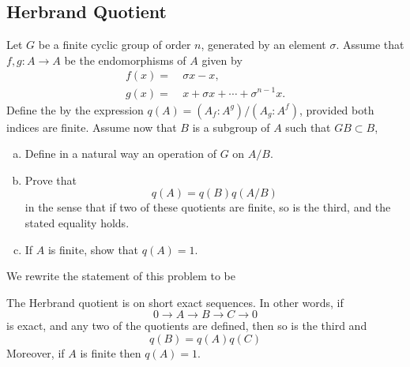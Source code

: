 \subsection{Herbrand Quotient}
\cite{serre1980local}
\begin{ex}
  Let $G$ be a finite cyclic group of order $n$, generated by an element $\sigma$. Assume that $f,g\colon A\to A$ be the endomorphisms of $A$ given by
  \begin{align*}
    f(x)=&\ \sigma x-x,\\
    g(x)=&\ x+\sigma x+\cdots +\sigma^{n-1}x.
  \end{align*}
  Define the  by the expression $q(A) = (A_f:A^g)/(A_g:A^f)$, provided both indices are finite. Assume now that $B$ is a subgroup of $A$ such that $GB\subset B$,
  \begin{enumerate}[a)]
    \setlength{\itemindent}{2ex}
    \item Define in a natural way an operation of $G$ on $A/B$.
    \item Prove that
    \begin{equation*}
      q(A)=q(B)q(A/B)
    \end{equation*}
    in the sense that if two of these quotients are finite, so is the third, and the stated equality holds.
    \item If $A$ is finite, show that $q(A)=1$.
  \end{enumerate}
\end{ex}
We rewrite the statement of this problem to be
\begin{prop}\label{hq}
  The Herbrand quotient is  on short exact sequences. In other words, if
\begin{equation*}
0\longrightarrow A\longrightarrow B\longrightarrow C\longrightarrow 0
\end{equation*}
is exact, and any two of the quotients are defined, then so is the third and
\begin{equation*}
q(B)=q(A)q(C)
\end{equation*}
Moreover, if $A$ is finite then $q(A)=1$.
\end{prop}

